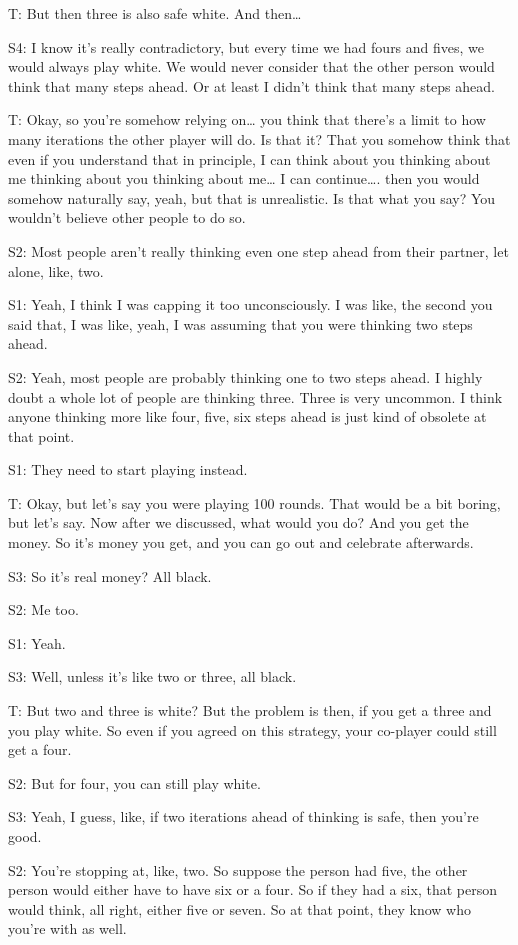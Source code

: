 T: But then three is also safe white. And then…

S4: I know it's really contradictory, but every time we had fours and fives, we would always play white. We would never consider that the other person would think that many steps ahead. Or at least I didn't think that many steps ahead. 

T:  Okay, so you're somehow relying on… you think that there's a limit to how many iterations the other player will do. Is that it? That you somehow think that even if you understand that in principle, I can think about you thinking about me thinking about you thinking about me… I can continue…. then you would somehow naturally say, yeah, but that is unrealistic. Is that what you say? You wouldn't believe other people to do so.

S2: Most people aren't really thinking even one step ahead from their partner, let alone, like, two. 

S1: Yeah, I think I was capping it too unconsciously. I was like, the second you said that, I was like, yeah, I was assuming that you were thinking two steps ahead.

S2: Yeah, most people are probably thinking one to two steps ahead. I highly doubt a whole lot of people are thinking three. Three is very uncommon. I think anyone thinking more like four, five, six steps ahead is just kind of obsolete at that point. 

S1: They need to start playing instead. 

T: Okay, but let's say you were playing 100 rounds. That would be a bit boring, but let's say. Now after we discussed, what would you do? And you get the money. So it's money you get, and you can go out and celebrate afterwards. 

S3: So it's real money? All black. 

S2: Me too.

S1: Yeah. 

S3: Well, unless it's like two or three, all black.

T: But two and three is white? But the problem is then, if you get a three and you play white. So even if you agreed on this strategy, your co-player could still get a four.

S2: But for four, you can still play white.

S3: Yeah, I guess, like, if two iterations ahead of thinking is safe, then you're good. 

S2: You're stopping at, like, two. So suppose the person had five, the other person would either have to have six or a four. So if they had a six, that person would think, all right, either five or seven. So at that point, they know who you're with as well. 

